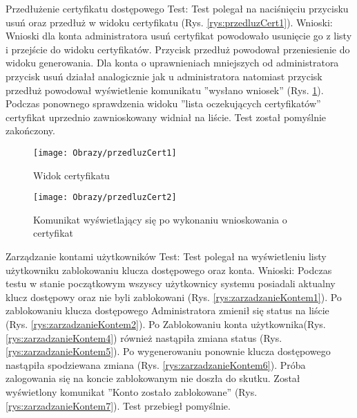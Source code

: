 \documentclass[twoside,10pt]{article}
\begin{document}
\begin{enumerate*}
\newpage
\item  Przedłużenie certyfikatu dostępowego\newline
Test: Test polegał na naciśnięciu przycisku usuń oraz przedłuż w widoku certyfikatu (Rys. \ref{rys:przedluzCert1}).\newline
Wnioski: Wnioski dla konta administratora usuń certyfikat powodowało usunięcie go z listy i przejście do widoku certyfikatów. Przycisk przedłuż powodował przeniesienie do widoku generowania. Dla konta o uprawnieniach  mniejszych od administratora przycisk usuń działał analogicznie jak u administratora natomiast przycisk przedłuż powodował wyświetlenie komunikatu ''wysłano wniosek'' (Rys. \ref{rys:przedluzCert2}).
Podczas ponownego sprawdzenia  widoku ''lista oczekujących certyfikatów'' certyfikat uprzednio zawnioskowany  widniał  na liście. Test został pomyślnie zakończony.

\begin{figure}[ht!]
\centering
\begin{minipage}{0.2\textwidth}
\texttt{[image: Obrazy/przedluzCert1]}
\caption{Widok certyfikatu }
\label{rys:przedluzCert1}
\end{minipage}
\hspace{0.02\textwidth}
\begin{minipage}{0.4\textwidth}
\texttt{[image: Obrazy/przedluzCert2]}
\caption{Komunikat wyświetlający się po wykonaniu wnioskowania o certyfikat }
\label{rys:przedluzCert2}
\end{minipage}
\end{figure}

\item Zarządzanie kontami użytkowników\newline
Test: Test polegał na wyświetleniu listy użytkowniku zablokowaniu klucza dostępowego oraz konta.\newline
Wnioski: Podczas testu w stanie początkowym wszyscy użytkownicy systemu posiadali aktualny klucz dostępowy oraz nie byli zablokowani (Rys. \ref{rys:zarzadzanieKontem1}). Po zablokowaniu klucza dostępowego  Administratora zmienił się status na liście (Rys. \ref{rys:zarzadzanieKontem2}). Po Zablokowaniu konta użytkownika(Rys. \ref{rys:zarzadzanieKontem4}) również nastąpiła zmiana  status  (Rys. \ref{rys:zarzadzanieKontem5}). Po wygenerowaniu ponownie klucza dostępowego nastąpiła spodziewana zmiana (Rys. \ref{rys:zarzadzanieKontem6}). Próba zalogowania się na koncie zablokowanym nie doszła do skutku. Został wyświetlony komunikat ''Konto zostało zablokowane'' (Rys. \ref{rys:zarzadzanieKontem7}). Test przebiegł pomyślnie.


\end{enumerate*}
\end{document}
